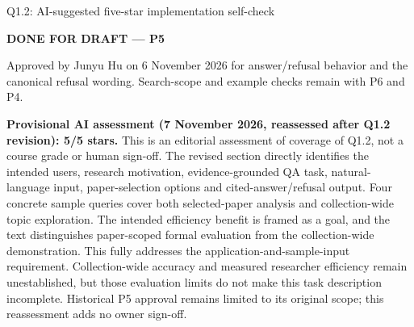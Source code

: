 \begin{review}{Q1.2: AI-suggested five-star implementation self-check}
\colorbox{yellow!45}{\strut\textbf{DONE FOR DRAFT --- P5}}\par
Approved by Junyu Hu on 6 November 2026 for answer/refusal behavior and the canonical refusal wording. Search-scope and example checks remain with P6 and P4.\par\smallskip
{}\quad\textbf{Provisional AI assessment (7 November 2026, reassessed after Q1.2 revision): 5/5 stars.} This is an editorial assessment of coverage of Q1.2, not a course grade or human sign-off. The revised section directly identifies the intended users, research motivation, evidence-grounded QA task, natural-language input, paper-selection options and cited-answer/refusal output. Four concrete sample queries cover both selected-paper analysis and collection-wide topic exploration. The intended efficiency benefit is framed as a goal, and the text distinguishes paper-scoped formal evaluation from the collection-wide demonstration. This fully addresses the application-and-sample-input requirement. Collection-wide accuracy and measured researcher efficiency remain unestablished, but those evaluation limits do not make this task description incomplete. Historical P5 approval remains limited to its original scope; this reassessment adds no owner sign-off.
\end{review}
